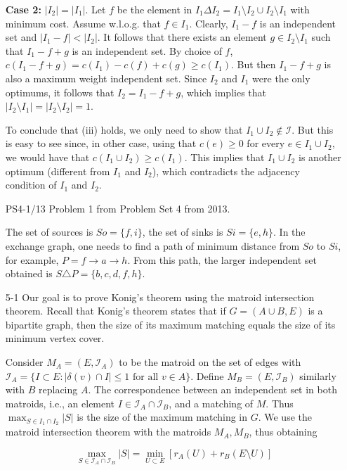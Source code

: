 \documentclass[12pt]{article}
\newcommand{\I}{\mathcal I}
\begin{document}
\begin{enumerate}
\textbf{Case 2:} $|I_2| = |I_1|$. Let $f$ be the element in $I_1\Delta I_2 = I_1\setminus I_2 \cup I_2 \setminus I_1$ with minimum cost. Assume w.l.o.g. that $f \in I_1$. Clearly, $I_1 - f$ is an independent set and $|I_1 - f| < |I_2|$. It follows that there exists an element $g \in I_2 \setminus I_1$ such that $I_1 - f + g$ is an independent set. By  choice of $f$, $c(I_1 -f + g) = c(I_1) - c(f) + c(g) \geq c(I_1)$. But then $I_1 - f + g$ is also a maximum weight independent set. Since $I_2$ and $I_1$ were the only optimums, it follows that $I_2 = I_1 - f + g$, which implies that $|I_2 \setminus I_1| = |I_2 \setminus I_2| = 1$. 

To conclude that (iii) holds, we only need to show that $I_1 \cup I_2 \not\in \mathcal{I}$. But this is easy to see since, in other case, using that $c(e) \geq 0$ for every $e \in I_1 \cup I_2$, we would have that $c(I_1 \cup I_2) \geq c(I_1)$. This implies that $I_1 \cup I_2$ is another optimum (different from $I_1$ and $I_2$), which contradicts the adjacency condition of $I_1$ and $I_2$.
\fi

\item[PS4-1/13] Problem 1 from Problem Set 4 from 2013. 

The set of sources is $So = \{f, i\}$, the set of sinks is $Si = \{e, h\}$.
In the exchange graph, one needs to find a path of minimum distance from
$So$ to $Si$, for example, $P = f \rightarrow a \rightarrow h$.
From this path, the larger independent set obtained is $S \triangle P = \{b, c, d, f, h\}$.

\item[5-1]
Our goal is to prove Konig's theorem using the matroid intersection theorem.
Recall that Konig's theorem states that if $G = (A\cup B, E)$ is a bipartite graph,
then the size of its maximum matching equals the size of its minimum vertex cover.

Consider $M_A = (E, \I_A)$ to be the matroid on the set of edges with
$\I_A = \{I \subset E : |\delta(v) \cap I| \leq 1 \textrm{ for all } v\in A\}$.
Define $M_B = (E, \I_B)$ similarly with $B$ replacing $A$.
The correspondence between an independent set in both matroids, i.e., an element
$I \in \I_A\cap\I_B$, and a matching of $M$.
Thus $\max_{S \in I_1\cap I_2} |S|$ is the size of the maximum matching in $G$.
We use the matroid intersection theorem with the matroids $M_A, M_B$, thus obtaining

$$
\max_{S \in \I_A\cap \I_B} |S| = 
\min_{U\subset E} [r_A(U) + r_B(E\setminus U)]
$$


\end{enumerate}
\end{document}
